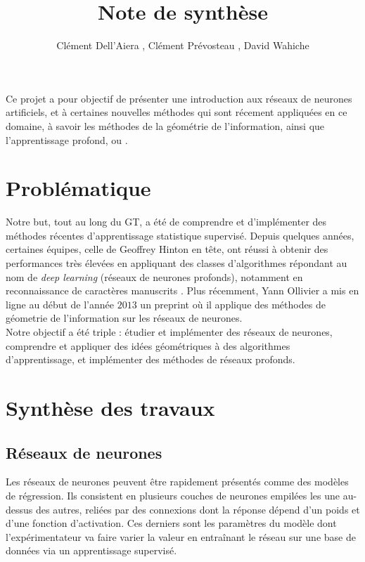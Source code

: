 \documentclass{article}
\title{Note de synthèse}
\author{Clément Dell'Aiera , Clément Prévosteau , David Wahiche}
\date{}
\begin{document}
\maketitle


Ce projet a pour objectif de présenter une introduction aux réseaux de neurones artificiels, et à certaines nouvelles méthodes qui sont récement appliquées en ce domaine, à savoir les méthodes de la géométrie de l'information, ainsi que l'apprentissage profond, ou .\\

\section{Problématique}

Notre but, tout au long du GT, a été de comprendre et d'implémenter des méthodes récentes d'apprentissage statistique supervisé. Depuis quelques années, certaines équipes, celle de Geoffrey Hinton en tête, ont réussi à obtenir des performances très élevées en appliquant des classes d'algorithmes répondant au nom de \textit{deep learning} (réseaux de neurones profonds), notamment en reconnaissance de caractères manuscrits . Plus récemment, Yann Ollivier a mis en ligne au début de l'année $2013$ un preprint où il applique des méthodes de géometrie de l'information sur les réseaux de neurones. \\

Notre objectif a été triple : étudier et implémenter des réseaux de neurones, comprendre et appliquer des idées géométriques à des algorithmes d'apprentissage, et implémenter des méthodes de réseaux profonds. \\


\section{Synthèse des travaux}

\subsection{Réseaux de neurones}
Les réseaux de neurones peuvent être rapidement présentés comme des modèles de régression. Ils consistent en plusieurs couches de neurones empilées les une au-dessus des autres, reliées par des connexions dont la réponse dépend d'un poids et d'une fonction d'activation. Ces derniers sont les paramètres du modèle dont l'expérimentateur va faire varier la valeur en entraînant le réseau sur une base de données via un apprentissage supervisé. \\
\end{document}
